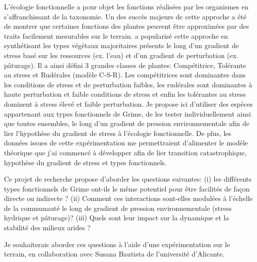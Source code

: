 \documentclass[12pt]{article} %
\begin{document}
L'écologie fonctionnelle a pour objet les fonctions réalisées par les organismes en s'affranchissant de la taxonomie. Un des succès majeurs de cette approche a été de montrer que certaines fonctions des plantes peuvent être approximées par des traits facilement mesurables sur le terrain. \citet{Grime1977a} a popularisé cette approche en synthétisant les types végétaux majoritaires présents le long d'un gradient de stress basé sur les ressources (ex. l'eau) et d'un gradient de perturbation (ex. pâturage). Il a ainsi défini 3 grandes classes de plantes: Compétitrice, Tolérante au stress et Rudérales (modèle C-S-R). Les compétitrices sont dominantes dans les conditions de stress et de perturbation faibles, les rudérales sont dominantes à haute perturbation et faible conditions de stress et enfin les tolérantes au stress dominent à stress élevé et faible perturbation. Je propose ici d'utiliser des espèces appartenant aux types fonctionnels de Grime, de les tester individuellement ainsi que toutes ensembles, le long d'un gradient de pression environnementale afin de lier l'hypothèse du gradient de stress à l'écologie fonctionnelle. De plus, les données issues de cette expérimentation me permettraient d'alimenter le modèle théorique que j'ai commencé à développer afin de lier transition catastrophique, hypothèse du gradient de stress et types fonctionnels.


Ce projet de recherche propose d'aborder les questions suivantes: (i) les différents types fonctionnels de Grime ont-ils le même potentiel pour être facilités de façon directe ou indirecte ?
(ii) Comment ces interactions sont-elles modulées à l'échelle de la communauté le long de gradient de pression environnementale (stress hydrique et pâturage)? (iii) Quels sont leur impact sur la dynamique et la stabilité des milieux arides ?

Je souhaiterais aborder ces questions à l'aide d'une expérimentation sur le terrain, en collaboration avec Susana Bautista de l'université d'Alicante. %

\end{document}
